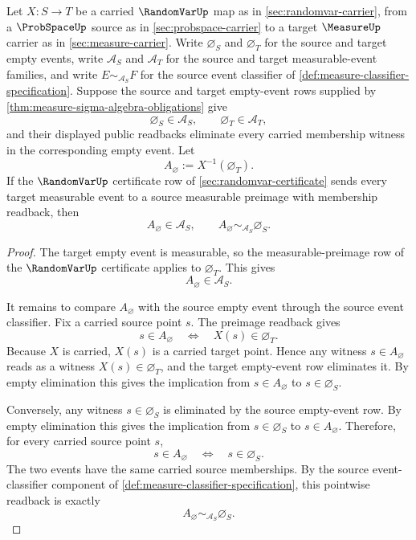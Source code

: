 \begin{theorem}
\label{thm:randomvar-preimage-empty-event-exactness}
Let $X:S\to T$ be a carried $\RandomVarUp$ map as in \autoref{sec:randomvar-carrier}, from a $\ProbSpaceUp$ source as in \autoref{sec:probspace-carrier} to a target $\MeasureUp$ carrier as in \autoref{sec:measure-carrier}. Write $\varnothing_S$ and $\varnothing_T$ for the source and target empty events, write $\mathcal{A}_S$ and $\mathcal{A}_T$ for the source and target measurable-event families, and write $E\sim_{\mathcal{A}_S}F$ for the source event classifier of \autoref{def:measure-classifier-specification}. Suppose the source and target empty-event rows supplied by \autoref{thm:measure-sigma-algebra-obligations} give
$$
\varnothing_S\in\mathcal{A}_S,\qquad \varnothing_T\in\mathcal{A}_T,
$$
and their displayed public readbacks eliminate every carried membership witness in the corresponding empty event. Let
$$
A_\varnothing:=X^{-1}(\varnothing_T).
$$
If the $\RandomVarUp$ certificate row of \autoref{sec:randomvar-certificate} sends every target measurable event to a source measurable preimage with membership readback, then
$$
A_\varnothing\in\mathcal{A}_S,\qquad A_\varnothing\sim_{\mathcal{A}_S}\varnothing_S.
$$
\end{theorem}
\begin{proof}
The target empty event is measurable, so the measurable-preimage row of the $\RandomVarUp$ certificate applies to $\varnothing_T$. This gives
$$
A_\varnothing\in\mathcal{A}_S.
$$

It remains to compare $A_\varnothing$ with the source empty event through the source event classifier. Fix a carried source point $s$. The preimage readback gives
$$
s\in A_\varnothing\quad\Longleftrightarrow\quad X(s)\in\varnothing_T.
$$
Because $X$ is carried, $X(s)$ is a carried target point. Hence any witness $s\in A_\varnothing$ reads as a witness $X(s)\in\varnothing_T$, and the target empty-event row eliminates it. By empty elimination this gives the implication from $s\in A_\varnothing$ to $s\in\varnothing_S$.

Conversely, any witness $s\in\varnothing_S$ is eliminated by the source empty-event row. By empty elimination this gives the implication from $s\in\varnothing_S$ to $s\in A_\varnothing$. Therefore, for every carried source point $s$,
$$
s\in A_\varnothing\quad\Longleftrightarrow\quad s\in\varnothing_S.
$$
The two events have the same carried source memberships. By the source event-classifier component of \autoref{def:measure-classifier-specification}, this pointwise readback is exactly
$$
A_\varnothing\sim_{\mathcal{A}_S}\varnothing_S.
$$
\end{proof}

